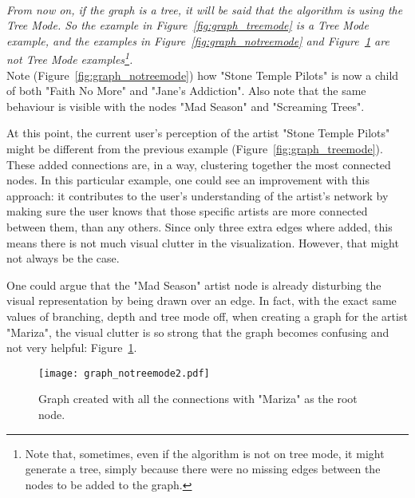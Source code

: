       \hfill \\
      \indent \emph{
      From now on, if the graph is a tree, it will be said that the algorithm is using the \emph{Tree Mode}.
      So the example in Figure~\ref{fig:graph_treemode} is a \emph{Tree Mode} example, and the examples in Figure~\ref{fig:graph_notreemode} and Figure~\ref{fig:graph_notreemode2} are not \emph{Tree Mode} examples\footnote{
        Note that, sometimes, even if the algorithm is not on tree mode, it might generate a tree, simply because there were no missing edges between the nodes to be added to the graph.
      }.}
      \hfill \\

      Note (Figure~\ref{fig:graph_notreemode}) how "Stone Temple Pilots" is now a child of both "Faith No More" and "Jane's Addiction".
      Also note that the same behaviour is visible with the nodes "Mad Season" and "Screaming Trees".

      At this point, the current user's perception of the artist "Stone Temple Pilots" might be different from the previous example (Figure~\ref{fig:graph_treemode}).
      These added connections are, in a way, clustering together the most connected nodes.
      In this particular example, one could see an improvement with this approach: it contributes to the user's understanding of the artist's network by making sure the user knows that those specific artists are more connected between them, than any others.
      Since only three extra edges where added, this means there is not much visual clutter in the visualization.
      However, that might not always be the case.

      One could argue that the "Mad Season" artist node is already disturbing the visual representation by being drawn over an edge.
      In fact, with the exact same values of branching, depth and tree mode off, when creating a graph for the artist "Mariza", the visual clutter is so strong that the graph becomes confusing and not very helpful: Figure~\ref{fig:graph_notreemode2}.

      \begin{figure}[tb]
        \begin{center}
          \texttt{[image: graph\_notreemode2.pdf]}
        \end{center}
        \caption{Graph created with all the connections with "Mariza" as the root node.}
        \label{fig:graph_notreemode2}
      \end{figure}

